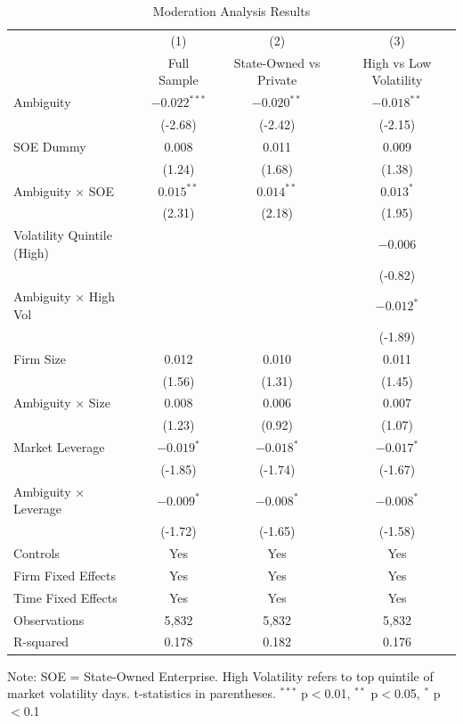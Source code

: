 \documentclass[12pt]{article}
\begin{document}
\begin{table}[htbp]
\centering
\caption{Moderation Analysis Results}
\label{tab:moderation_results}
\begin{tabular}{lccc}
\toprule
 & (1) & (2) & (3) \\
 & Full Sample & State-Owned vs Private & High vs Low Volatility \\
\midrule
Ambiguity & $-0.022^{***}$ & $-0.020^{**}$ & $-0.018^{**}$ \\
 & (-2.68) & (-2.42) & (-2.15) \\
SOE Dummy & 0.008 & 0.011 & 0.009 \\
 & (1.24) & (1.68) & (1.38) \\
Ambiguity × SOE & $0.015^{**}$ & $0.014^{**}$ & $0.013^{*}$ \\
 & (2.31) & (2.18) & (1.95) \\
\midrule
Volatility Quintile (High) &  &  & $-0.006$ \\
 &  &  & (-0.82) \\
Ambiguity × High Vol &  &  & $-0.012^{*}$ \\
 &  &  & (-1.89) \\
\midrule
Firm Size & 0.012 & 0.010 & 0.011 \\
 & (1.56) & (1.31) & (1.45) \\
Ambiguity × Size & 0.008 & 0.006 & 0.007 \\
 & (1.23) & (0.92) & (1.07) \\
\midrule
Market Leverage & $-0.019^{*}$ & $-0.018^{*}$ & $-0.017^{*}$ \\
 & (-1.85) & (-1.74) & (-1.67) \\
Ambiguity × Leverage & $-0.009^{*}$ & $-0.008^{*}$ & $-0.008^{*}$ \\
 & (-1.72) & (-1.65) & (-1.58) \\
\midrule
Controls & Yes & Yes & Yes \\
Firm Fixed Effects & Yes & Yes & Yes \\
Time Fixed Effects & Yes & Yes & Yes \\
\midrule
Observations & 5,832 & 5,832 & 5,832 \\
R-squared & 0.178 & 0.182 & 0.176 \\
\bottomrule
\end{tabular}
\footnotesize
Note: SOE = State-Owned Enterprise. High Volatility refers to top quintile of market volatility days. t-statistics in parentheses. $^{***}$ p$<$0.01, $^{**}$ p$<$0.05, $^{*}$ p$<$0.1
\end{table}
\end{document}
